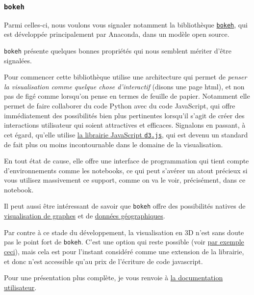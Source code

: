     \hypertarget{bokeh}{%
\subsubsection{\texorpdfstring{\texttt{bokeh}}{bokeh}}\label{bokeh}}

    Parmi celles-ci, nous voulons vous signaler notamment la bibliothèque
\href{https://bokeh.pydata.org/en/latest/}{\texttt{bokeh}}, qui est
développée principalement par Anaconda, dans un modèle open source.

\texttt{bokeh} présente quelques bonnes propriétés qui nous semblent
mériter d'être signalées.

    Pour commencer cette bibliothèque utilise une architecture qui permet de
\emph{penser la visualisation comme quelque chose d'interactif} (disons
une page html), et non pas de figé comme lorsqu'on pense en termes de
feuille de papier. Notamment elle permet de faire collaborer du code
Python avec du code JavaScript, qui offre immédiatement des possibilités
bien plus pertinentes lorsqu'il s'agit de créer des interactions
utilisateur qui soient attractives et efficaces. Signalons en passant, à
cet égard, qu'elle utilise \href{https://d3js.org/}{la librairie
JavaScript \texttt{d3.js}}, qui est devenu un standard de fait plus ou
moins incontournable dans le domaine de la visualisation.

En tout état de cause, elle offre une interface de programmation qui
tient compte d'environnements comme les notebooks, ce qui peut s'avérer
un atout précieux si vous utilisez massivement ce support, comme on va
le voir, précisément, dans ce notebook.

    Il peut aussi être intéressant de savoir que \texttt{bokeh} offre des
possibilités natives de
\href{https://bokeh.pydata.org/en/latest/docs/user_guide/graph.html}{visualisation
de graphes} et de
\href{https://bokeh.pydata.org/en/latest/docs/user_guide/geo.html\#}{données
géographiques}.

    Par contre à ce stade du développement, la visualisation en 3D n'est
sans doute pas le point fort de \texttt{bokeh}. C'est une option qui
reste possible (voir
\href{https://github.com/bokeh/bokeh/tree/master/examples/app/surface3d}{par
exemple ceci}), mais cela est pour l'instant considéré comme une
extension de la librairie, et donc n'est accessible qu'au prix de
l'écriture de code javascript.

    Pour une présentation plus complète, je vous renvoie à
\href{https://bokeh.pydata.org/en/latest/docs/user_guide.html}{la
documentation utilisateur}.

